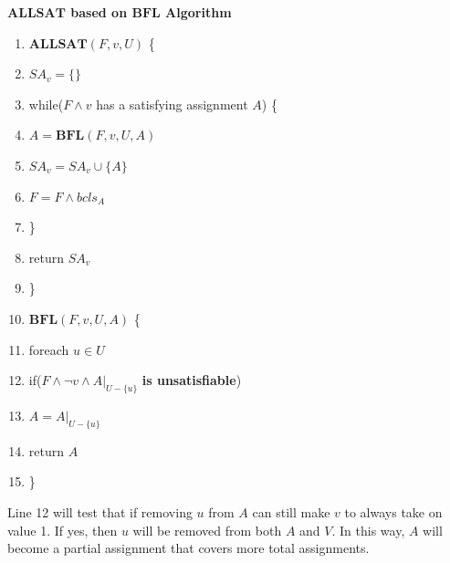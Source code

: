 \documentclass[journal]{IEEEtran}
\begin{document}
\begin{algo}
\textbf{$\boldsymbol{ALLSAT}$ based on $\boldsymbol{BFL}$ Algorithm}
\begin{enumerate}%
\item $\boldsymbol{ALLSAT}(F,v,U)$ \{
\item \hspace{0.3cm} $SA_v=\{\}$
\item \hspace{0.3cm} while($F\wedge v$ has a satisfying assignment $A$) \{
\item \hspace{0.6cm} $A= \boldsymbol{BFL}(F,v,U,A)$
\item \hspace{0.6cm} $SA_v= SA_v\cup \{A\}$
\item \hspace{0.6cm} $F= F\wedge bcls_A$
\item \hspace{0.3cm} \}
\item \hspace{0.3cm} return $SA_v$
\item \}
\item $\boldsymbol{BFL}(F,v,U,A)$ \{
\item \hspace{0.3cm} foreach $u\in U$
\item \hspace{0.6cm}  if($F\wedge \neg v\wedge A|_{U -\{u\}}$ \textbf{is unsatisfiable})
\item \hspace{0.9cm}     $A= A|_{U -\{u\}}$
\item \hspace{0.3cm} return $A$
\item \}
\end{enumerate}
\end{algo}

\vspace{0.2cm}

Line 12 will test that if removing $u$ from $A$ can still make $v$ to always take on value 1.
If yes, then $u$ will be removed from both $A$ and $V$.
In this way, $A$ will become a partial assignment that covers more total assignments.
\end{document}
